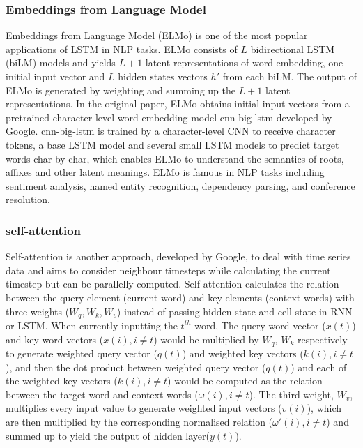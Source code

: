 \subsubsection{Embeddings from Language Model}
Embeddings from Language Model (ELMo)\cite{peters2018} is one of the most popular applications of LSTM in NLP tasks.
ELMo consists of $L$ bidirectional LSTM (biLM) models and yields $L+1$ latent representations of word embedding, one initial input vector and $L$ hidden states vectors $h'$ from each biLM.
The output of ELMo is generated by weighting and summing up the $L+1$ latent representations.
In the original paper, ELMo obtains initial input vectors from a pretrained character-level word embedding model cnn-big-lstm\cite{jozefowicz2016exploring} developed by Google.
cnn-big-lstm is trained by a character-level CNN to receive character tokens, a base LSTM model and several small LSTM models to predict target words char-by-char, which enables ELMo to understand the semantics of roots, affixes and other latent meanings.
ELMo is famous in NLP tasks including sentiment analysis, named entity recognition, dependency parsing\cite{dozat2016deep}, and conference resolution\cite{lee2018higher}.

\subsubsection{self-attention}
Self-attention is another approach, developed by Google, to deal with time series data and aims to consider neighbour timesteps while calculating the current timestep but can be parallelly computed\cite{vaswani2017attention}.
Self-attention calculates the relation between the query element (current word) and key elements (context words) with three weights ($W_q, W_k, W_v$) instead of passing hidden state and cell state in RNN or LSTM.
When currently inputting the $t^{th}$ word, The query word vector ($x(t)$) and key word vectors ($x(i), i\neq t $) would be multiplied by $W_q$, $W_k$ respectively to generate weighted query vector ($q(t)$) and weighted key vectors ($k(i), i\neq t$), and then the dot product between weighted query vector ($q(t)$) and each of the weighted key vectors ($k(i), i\neq t$) would be computed as the relation between the target word and context words ($\omega (i), i\neq t $).
The third weight, $W_v$, multiplies every input value to generate weighted input vectors ($v(i)$), which are then multiplied by the corresponding normalised relation ($\omega '(i), i\neq t $) and summed up to yield the output of hidden layer($y(t)$).

